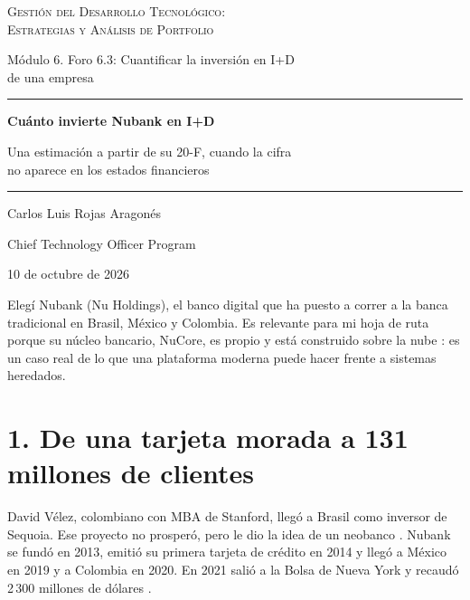\documentclass[11pt,letterpaper]{article}
\begin{document}
\begin{titlepage}
\centering
\vspace*{3.2cm}
{\large\scshape Gestión del Desarrollo Tecnológico:\\
Estrategias y Análisis de Portfolio\par}
\vspace{0.5cm}
{\normalsize Módulo 6. Foro 6.3: Cuantificar la inversión en I+D\\
de una empresa\par}
\vspace{2.6cm}
{\color{cEje}\rule{0.55\textwidth}{0.8pt}\par}
\vspace{0.7cm}
{\LARGE\bfseries Cuánto invierte Nubank en I+D\par}
\vspace{0.5cm}
{\large Una estimación a partir de su 20-F, cuando la cifra\\
no aparece en los estados financieros\par}
\vspace{0.7cm}
{\color{cEje}\rule{0.55\textwidth}{0.8pt}\par}
\vfill
{\large Carlos Luis Rojas Aragonés\par}
\vspace{0.3cm}
{\normalsize Chief Technology Officer Program\par}
\vspace{0.3cm}
{\normalsize 10 de octubre de 2026\par}
\vspace*{1.5cm}
\end{titlepage}

Elegí Nubank (Nu Holdings), el banco digital que ha puesto a correr a la
banca tradicional en Brasil, México y Colombia. Es relevante para mi hoja de
ruta porque su núcleo bancario, NuCore, es propio y está construido sobre la
nube \parencite{nu2026}: es un caso real de lo que una plataforma moderna
puede hacer frente a sistemas heredados.

\section*{1. De una tarjeta morada a 131 millones de clientes}

David Vélez, colombiano con MBA de Stanford, llegó a Brasil como inversor de
Sequoia. Ese proyecto no prosperó, pero le dio la idea de un neobanco
\parencite{lankenau2023}. Nubank se fundó en 2013, emitió su primera tarjeta
de crédito en 2014 y llegó a México en 2019 y a Colombia en 2020. En 2021
salió a la Bolsa de Nueva York y recaudó 2\,300 millones de dólares
\parencite{nu2026}.
\end{document}
